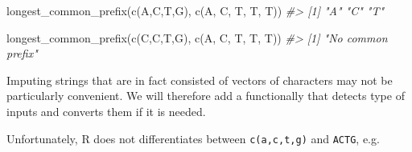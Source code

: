 \documentclass[
]{book}
\newenvironment{Shaded}{\begin{snugshade}}{\end{snugshade}}
\newcommand{\CommentTok}[1]{\textcolor[rgb]{0.56,0.35,0.01}{\textit{#1}}}
\newcommand{\FunctionTok}[1]{\textcolor[rgb]{0.00,0.00,0.00}{#1}}
\newcommand{\NormalTok}[1]{#1}
\newcommand{\StringTok}[1]{\textcolor[rgb]{0.31,0.60,0.02}{#1}}
\begin{document}
\begin{Shaded}
\begin{Highlighting}[]
\FunctionTok{longest\_common\_prefix}\NormalTok{(}\FunctionTok{c}\NormalTok{(}\StringTok{\textquotesingle{}A\textquotesingle{}}\NormalTok{,}\StringTok{\textquotesingle{}C\textquotesingle{}}\NormalTok{,}\StringTok{\textquotesingle{}T\textquotesingle{}}\NormalTok{,}\StringTok{\textquotesingle{}G\textquotesingle{}}\NormalTok{), }\FunctionTok{c}\NormalTok{(}\StringTok{\textquotesingle{}A\textquotesingle{}}\NormalTok{, }\StringTok{\textquotesingle{}C\textquotesingle{}}\NormalTok{, }\StringTok{\textquotesingle{}T\textquotesingle{}}\NormalTok{, }\StringTok{\textquotesingle{}T\textquotesingle{}}\NormalTok{, }\StringTok{\textquotesingle{}T\textquotesingle{}}\NormalTok{))}
\CommentTok{\#\textgreater{} [1] "A" "C" "T"}

\FunctionTok{longest\_common\_prefix}\NormalTok{(}\FunctionTok{c}\NormalTok{(}\StringTok{\textquotesingle{}C\textquotesingle{}}\NormalTok{,}\StringTok{\textquotesingle{}C\textquotesingle{}}\NormalTok{,}\StringTok{\textquotesingle{}T\textquotesingle{}}\NormalTok{,}\StringTok{\textquotesingle{}G\textquotesingle{}}\NormalTok{), }\FunctionTok{c}\NormalTok{(}\StringTok{\textquotesingle{}A\textquotesingle{}}\NormalTok{, }\StringTok{\textquotesingle{}C\textquotesingle{}}\NormalTok{, }\StringTok{\textquotesingle{}T\textquotesingle{}}\NormalTok{, }\StringTok{\textquotesingle{}T\textquotesingle{}}\NormalTok{, }\StringTok{\textquotesingle{}T\textquotesingle{}}\NormalTok{))}
\CommentTok{\#\textgreater{} [1] "No common prefix"}
\end{Highlighting}
\end{Shaded}

Imputing strings that are in fact consisted of vectors of characters may not be particularly convenient. We will therefore add a functionally that detects type of inputs and converts them if it is needed.

Unfortunately, R does not differentiates between \texttt{c(\textquotesingle{}a\textquotesingle{},\textquotesingle{}c\textquotesingle{},\textquotesingle{}t\textquotesingle{},\textquotesingle{}g\textquotesingle{})} and \texttt{\textquotesingle{}ACTG\textquotesingle{}}, e.g.
\end{document}
